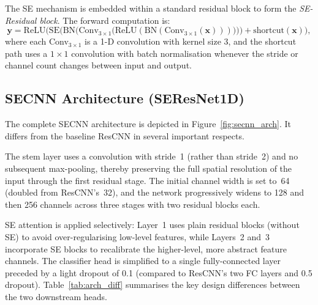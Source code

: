 \documentclass[12pt,a4paper]{article}
\begin{document}
The SE mechanism is embedded within a standard residual block to form the \emph{SE-Residual block}.  The forward computation is:
\begin{equation}
  \mathbf{y} = \text{ReLU}\!\Big(\text{SE}\!\big(\text{BN}\bigl(\text{Conv}_{3\times1}\bigl(\text{ReLU}(\text{BN}(\text{Conv}_{3\times1}(\mathbf{x})))\bigr)\bigr)\big) + \text{shortcut}(\mathbf{x})\Big),
  \label{eq:seresblock}
\end{equation}
where each Conv$_{3\times1}$ is a 1-D convolution with kernel size 3, and the shortcut path uses a $1\times1$ convolution with batch normalisation whenever the stride or channel count changes between input and output.

\subsection{SECNN Architecture (SEResNet1D)}

The complete SECNN architecture is depicted in Figure~\ref{fig:secnn_arch}.  It differs from the baseline ResCNN in several important respects.

The stem layer uses a convolution with stride~1 (rather than stride~2) and no subsequent max-pooling, thereby preserving the full spatial resolution of the input through the first residual stage.  The initial channel width is set to~64 (doubled from ResCNN's~32), and the network progressively widens to 128 and then 256 channels across three stages with two residual blocks each.

SE attention is applied selectively: Layer~1 uses plain residual blocks (without SE) to avoid over-regularising low-level features, while Layers~2 and~3 incorporate SE blocks to recalibrate the higher-level, more abstract feature channels.  The classifier head is simplified to a single fully-connected layer preceded by a light dropout of 0.1 (compared to ResCNN's two FC layers and 0.5 dropout). Table~\ref{tab:arch_diff} summarises the key design differences between the two downstream heads.
\end{document}

